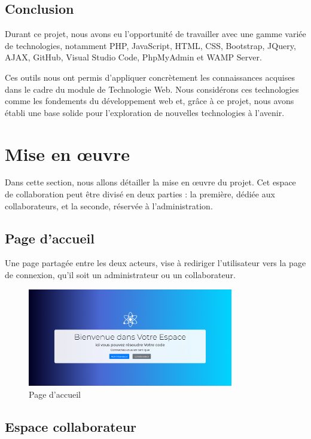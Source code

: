 \documentclass{article}
\begin{document}
        \subsection{Conclusion}
            Durant ce projet, nous avons eu l'opportunité de travailler avec une gamme variée de technologies, notamment PHP, JavaScript, HTML, CSS, Bootstrap, JQuery, AJAX, GitHub, Visual Studio Code, PhpMyAdmin et WAMP Server. 

            Ces outils nous ont permis d'appliquer concrètement les connaissances acquises dans le cadre du module de Technologie Web. Nous considérons ces technologies comme les fondements du développement web et, grâce à ce projet, nous avons établi une base solide pour l'exploration de nouvelles technologies à l'avenir.
    
            \section{Mise en œuvre}
            Dans cette section, nous allons détailler la mise en œuvre du projet. Cet espace de collaboration peut être divisé en deux parties : la première, dédiée aux collaborateurs, et la seconde, réservée à l'administration.
            \subsection{Page d'accueil}
                    Une page partagée entre les deux acteurs, vise à rediriger l'utilisateur vers la page de connexion, qu'il soit un administrateur ou un collaborateur.
                    \begin{figure}[h!]
                        \centering
                        \includegraphics[width=0.8\textwidth]{assets/webSite/homePage.png}
                        \caption{Page d'accueil}
                    \end{figure}
                    \FloatBarrier
            \subsection{Espace collaborateur}
\end{document}

